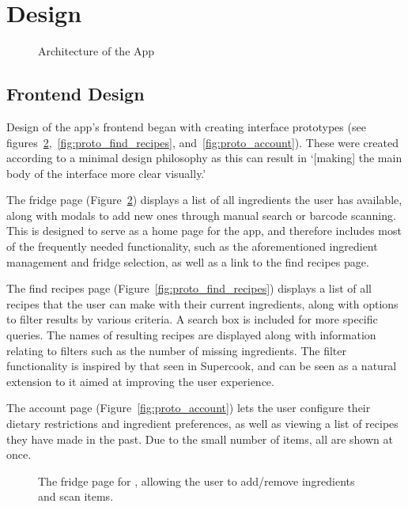 \section{Design}

\begin{figure}
    \centering
    
    \caption{\label{fig:architecture}Architecture of the App}
\end{figure}

\subsection{Frontend Design}
Design of the \chef{} app's frontend began with creating interface prototypes (see figures~\ref{fig:proto_fridge},~\ref{fig:proto_find_recipes},
and~\ref{fig:proto_account}). These were created according to a minimal design philosophy as this can result in \enquote*{[making] the main
body of the interface more clear visually.}~\cite{dong_minimalist_2019}

The fridge page (Figure~\ref{fig:proto_fridge}) displays a list of all ingredients the user has available, along with modals to add new ones
through manual search or barcode scanning. This is designed to serve as a home page for the app, and therefore includes most of the frequently
needed functionality, such as the aforementioned ingredient management and fridge selection, as well as a link to the find recipes page.

The find recipes page (Figure~\ref{fig:proto_find_recipes}) displays a list of all recipes that the user can make with their current ingredients,
along with options to filter results by various criteria. A search box is included for more specific queries. The names of resulting recipes are
displayed along with information relating to filters such as the number of missing ingredients. The filter functionality is inspired by that seen
in Supercook, and can be seen as a natural extension to it aimed at improving the user experience.

The account page (Figure~\ref{fig:proto_account}) lets the user configure their dietary restrictions and ingredient preferences, as well as
viewing a list of recipes they have made in the past. Due to the small number of items, all are shown at once.

\begin{figure}[ht]
  \centering
  
  \caption{\label{fig:proto_fridge}The fridge page for \chef{}, allowing the user to add/remove ingredients and scan items.}
\end{figure}

